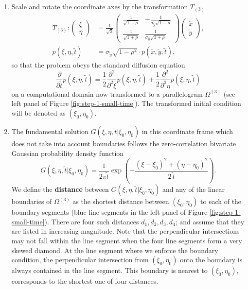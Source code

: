 \begin{enumerate}
\item Scale and rotate the coordinate axes by the transformation
  $T_{(3)}$
  \begin{align}
    T_{(3)}: \left( \begin{array}{c}
             \xi \\
             \eta
           \end{array} \right) &= \frac{1}{\sqrt{2}}
         \left( \begin{array}{cc}
                  \frac{1}{ \sqrt{1-\rho}} & -\frac{1}{\sigma_{\tilde{y}}\sqrt{1-\rho}}\\
                  \frac{1}{ \sqrt{1+\rho}} & \frac{1}{\sigma_{\tilde{y}}\sqrt{1+\rho}}
                \end{array} \right)
             \left( \begin{array}{cc}
             \tilde{x} \\
                      \tilde{y}
                    \end{array} \right), \label{eq:T3} \\
    p(\xi,\eta,\tilde{t}) &= \sigma_{\tilde{y}}\sqrt{1-\rho^2} \cdot p(\tilde{x},\tilde{y},\tilde{t}), \nonumber
       \end{align}
       so that the problem obeys the standard diffusion equation
       \[
         \frac{\partial }{\partial \tilde{t}}p(\xi,\eta,\tilde{t}) =
         \frac{1}{2}\frac{\partial^2 }{\partial^2 \xi} p(\xi,\eta,\tilde{t})+
         \frac{1}{2}\frac{\partial^2 }{\partial^2 \eta} p(\xi,\eta,\tilde{t})
       \]
       on a computational domain now transformed to a parallelogram
       $\Omega^{(3)}$ (see left panel of Figure
       \ref{fig:step-1-small-time}). The transformed initial
       condition will be denoted as $(\xi_0, \eta_0)$.

     \item The fundamental solution
       $G(\xi,\eta,\tilde{t} | \xi_0, \eta_0)$ in this coordinate
       frame which does not take into account boundaries follows the
       zero-correlation bivariate Gaussian probability density
       function
  \[
    G(\xi,\eta,\tilde{t} | \xi_0, \eta_0) = \frac{1}{2\pi \tilde{t}} \exp\left(-\frac{(\xi-\xi_0)^2 +
        (\eta-\eta_0)^2}{2\,\tilde{t}} \right).
  \]
  We define the \textbf{distance} between
  $G(\xi,\eta,\tilde{t} | \xi_0, \eta_0)$ and any of the linear
  boundaries of $\Omega^{(3)}$ as the shortest distance between
  $(\xi_0, \eta_0)$ to each of the boundary segments (blue line
  segments in the left panel of Figure \ref{fig:step-1-small-time}).
  There are four such distances $d_1, d_2, d_3, d_4$; and assume that
  they are listed in increasing magnitude. Note that the perpendicular
  intersections may not fall within the line segment when the four
  line segments form a very skewed diamond. At the line
  segment where we enforce the boundary condition, the perpendicular
  intersection from $(\xi_0, \eta_0)$ onto the boundary is always
  contained in the line segment. This boundary is nearest to
  $(\xi_0, \eta_0)$, corresponds to the shortest one of four
  distances.


\end{enumerate}
